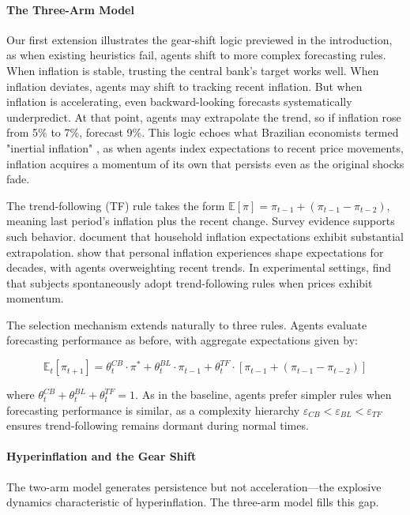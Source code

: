 \documentclass[10pt]{article}
\begin{document}
\paragraph{The Three-Arm Model} Our first extension illustrates the gear-shift logic previewed in the introduction, as when existing heuristics fail, agents shift to more complex forecasting rules. When inflation is stable, trusting the central bank's target works well. When inflation deviates, agents may shift to tracking recent inflation. But when inflation is accelerating, even backward-looking forecasts systematically underpredict. At that point, agents may extrapolate the trend, so if inflation rose from 5\% to 7\%, forecast 9\%. This logic echoes what Brazilian economists termed "inertial inflation" \citep{bresserpereira2023inertial}, as when agents index expectations to recent price movements, inflation acquires a momentum of its own that persists even as the original shocks fade.

The trend-following (TF) rule takes the form $\mathbb{E}[\pi] = \pi_{t-1} + (\pi_{t-1} - \pi_{t-2})$, meaning last period's inflation plus the recent change. Survey evidence supports such behavior. \cite{coibion2015} document that household inflation expectations exhibit substantial extrapolation. \cite{malmendier2016learning} show that personal inflation experiences shape expectations for decades, with agents overweighting recent trends. In experimental settings, \cite{hommes2017} find that subjects spontaneously adopt trend-following rules when prices exhibit momentum.

The selection mechanism extends naturally to three rules. Agents evaluate forecasting performance as before, with aggregate expectations given by:

\begin{equation}
\mathbb{E}_t[\pi_{t+1}] = \theta^{CB}_t \cdot \pi^* + \theta^{BL}_t \cdot \pi_{t-1} + \theta^{TF}_t \cdot \left[\pi_{t-1} + (\pi_{t-1} -\pi_{t-2})\right]
\end{equation}

where $\theta^{CB}_t + \theta^{BL}_t + \theta^{TF}_t = 1$. As in the baseline, agents prefer simpler rules when forecasting performance is similar, as a complexity hierarchy $\varepsilon_{CB} < \varepsilon_{BL} <\varepsilon_{TF}$ ensures trend-following remains dormant during normal times.

\paragraph{Hyperinflation and the Gear Shift} The two-arm model generates persistence but not acceleration—the explosive dynamics characteristic of hyperinflation. The three-arm model fills this gap.
\end{document}

